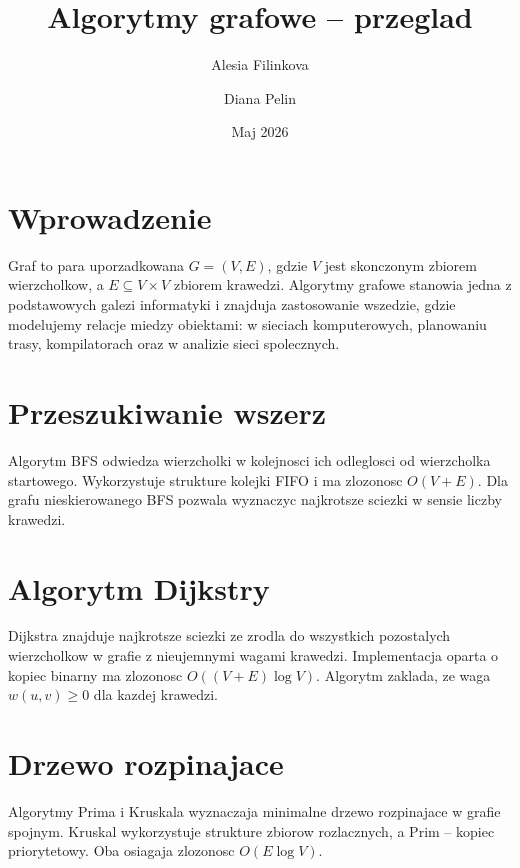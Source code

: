 \documentclass[12pt,a4paper]{article}
\title{Algorytmy grafowe -- przeglad}
\author{Alesia Filinkova \and Diana Pelin}
\date{Maj 2026}
\begin{document}
\maketitle

\section{Wprowadzenie}

Graf to para uporzadkowana $G = (V, E)$, gdzie $V$ jest skonczonym
zbiorem wierzcholkow, a $E \subseteq V \times V$ zbiorem krawedzi.
Algorytmy grafowe stanowia jedna z podstawowych galezi informatyki
i znajduja zastosowanie wszedzie, gdzie modelujemy relacje miedzy
obiektami: w sieciach komputerowych, planowaniu trasy, kompilatorach
oraz w analizie sieci spolecznych.

\section{Przeszukiwanie wszerz}

Algorytm BFS odwiedza wierzcholki w kolejnosci ich odleglosci od
wierzcholka startowego. Wykorzystuje strukture kolejki FIFO i ma
zlozonosc $O(V + E)$. Dla grafu nieskierowanego BFS pozwala wyznaczyc
najkrotsze sciezki w sensie liczby krawedzi.

\section{Algorytm Dijkstry}

Dijkstra znajduje najkrotsze sciezki ze zrodla do wszystkich
pozostalych wierzcholkow w grafie z nieujemnymi wagami krawedzi.
Implementacja oparta o kopiec binarny ma zlozonosc $O((V + E) \log V)$.
Algorytm zaklada, ze waga $w(u, v) \geq 0$ dla kazdej krawedzi.

\section{Drzewo rozpinajace}

Algorytmy Prima i Kruskala wyznaczaja minimalne drzewo rozpinajace
w grafie spojnym. Kruskal wykorzystuje strukture zbiorow rozlacznych,
a Prim -- kopiec priorytetowy. Oba osiagaja zlozonosc $O(E \log V)$.
\end{document}
